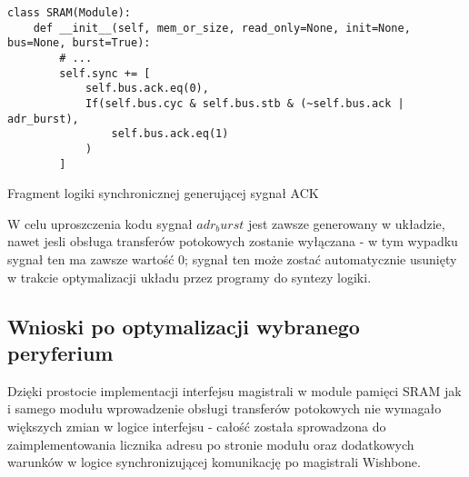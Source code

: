 \begin{listing}[H]
\begin{verbatim}
class SRAM(Module):
    def __init__(self, mem_or_size, read_only=None, init=None, bus=None, burst=True):
        # ...
        self.sync += [
            self.bus.ack.eq(0),
            If(self.bus.cyc & self.bus.stb & (~self.bus.ack | adr_burst),
                self.bus.ack.eq(1)
            )
        ]
\end{verbatim}
\caption{\label{lst:impl-sram-adrnext}Fragment logiki synchronicznej generującej sygnał ACK}
\end{listing}

W celu uproszczenia kodu sygnał $adr_burst$ jest zawsze generowany w układzie, nawet jesli obsługa transferów potokowych zostanie wyłączana - w tym wypadku sygnał ten ma zawsze wartość $0$; sygnał ten może zostać automatycznie usunięty w trakcie optymalizacji układu przez programy do syntezy logiki.

\subsection{Wnioski po optymalizacji wybranego peryferium}

Dzięki prostocie implementacji interfejsu magistrali w module pamięci SRAM jak i samego modułu wprowadzenie obsługi transferów potokowych nie wymagało większych zmian w logice interfejsu - całość została sprowadzona do zaimplementowania licznika adresu po stronie modułu oraz dodatkowych warunków w logice synchronizującej komunikację po magistrali Wishbone.
